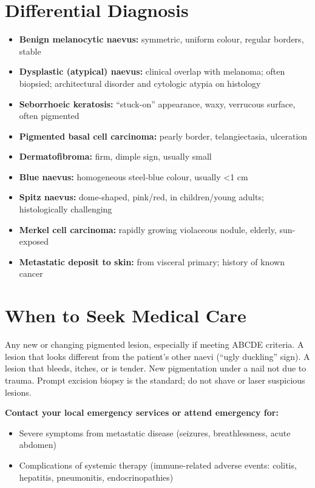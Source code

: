 \section*{Differential Diagnosis}
\begin{itemize}
    \item \textbf{Benign melanocytic naevus:} symmetric, uniform colour, regular borders, stable
    \item \textbf{Dysplastic (atypical) naevus:} clinical overlap with melanoma; often biopsied; architectural disorder and cytologic atypia on histology
    \item \textbf{Seborrhoeic keratosis:} ``stuck-on'' appearance, waxy, verrucous surface, often pigmented
    \item \textbf{Pigmented basal cell carcinoma:} pearly border, telangiectasia, ulceration
    \item \textbf{Dermatofibroma:} firm, dimple sign, usually small
    \item \textbf{Blue naevus:} homogeneous steel-blue colour, usually <1 cm
    \item \textbf{Spitz naevus:} dome-shaped, pink/red, in children/young adults; histologically challenging
    \item \textbf{Merkel cell carcinoma:} rapidly growing violaceous nodule, elderly, sun-exposed
    \item \textbf{Metastatic deposit to skin:} from visceral primary; history of known cancer
\end{itemize}

\section*{When to Seek Medical Care}
Any new or changing pigmented lesion, especially if meeting ABCDE criteria. A lesion that looks different from the patient's other naevi (``ugly duckling'' sign). A lesion that bleeds, itches, or is tender. New pigmentation under a nail not due to trauma. Prompt excision biopsy is the standard; do not shave or laser suspicious lesions.

\textbf{Contact your local emergency services or attend emergency for:}
\begin{itemize}
    \item Severe symptoms from metastatic disease (seizures, breathlessness, acute abdomen)
    \item Complications of systemic therapy (immune-related adverse events: colitis, hepatitis, pneumonitis, endocrinopathies)
\end{itemize}

